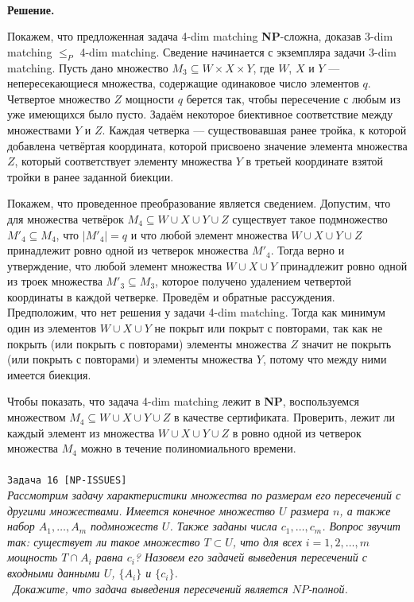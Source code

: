 \documentclass[10pt]{article}
\begin{document}
\ \\[0.3cm]
\textbf{Решение.} 
\medskip\par 
Покажем, что предложенная задача 4-dim matching \textbf{NP}-сложна, доказав 3-dim matching $\leq_P$ 4-dim matching. Сведение начинается с экземпляра задачи 3-dim matching. Пусть дано множество  $M_3 \subseteq W\times X\times Y$, где $W$, $X$ и $Y$ --- непересекающиеся множества, содержащие одинаковое число элементов $q$. Четвертое множество $Z$ мощности $q$ берется так, чтобы пересечение с любым из уже имеющихся было пусто. Задаём некоторое биективное соответствие между множествами $Y$ и $Z$. Каждая четверка --- существовавшая ранее тройка, к которой добавлена четвёртая координата, которой присвоено значение элемента множества $Z$, который соответствует элементу множества $Y$ в третьей координате взятой тройки в ранее заданной биекции.
\medskip\par Покажем, что проведенное преобразование является сведением. Допустим, что для множества четвёрок $M_4\subseteq W\cup X\cup Y\cup Z$ существует такое подмножество $M'_4\subseteq M_4$, что $|M'_4|=q$ и что любой элемент множества $W\cup X\cup Y\cup Z$ принадлежит ровно одной из четверок множества $M'_4$. Тогда верно и утверждение, что любой элемент множества $W\cup X\cup Y$ принадлежит ровно одной из троек множества $M'_3\subseteq M_3$, которое получено удалением четвертой координаты в каждой четверке. Проведём и обратные рассуждения. Предположим, что нет решения у задачи 4-dim matching. Тогда как минимум один из элементов $W\cup X\cup Y$ не покрыт или покрыт с повторами, так как не покрыть (или покрыть с повторами) элементы множества $Z$ значит не покрыть (или покрыть с повторами) и элементы множества $Y$, потому что между ними имеется биекция.
\medskip\par Чтобы показать, что задача 4-dim matching лежит в \textbf{NP}, воспользуемся множеством $M_4\subseteq W\cup X\cup Y\cup Z$ в качестве сертификата. Проверить, лежит ли каждый элемент из множества $W\cup X\cup Y\cup Z$ в ровно одной из четверок множества $M_4$ можно в течение полиномиального времени.
\ \\[0.5 cm]
\hline
\ \\[0.5 cm]
{\large\texttt{Задача 16 [NP-ISSUES]}}
\ \\[0.1cm]
\textit{Рассмотрим задачу характеристики множества по размерам его пересечений
с другими множествами. Имеется конечное множество $U$ размера $n$, а также
набор $A_1, \dots, A_m$ подмножеств $U$. Также заданы числа $c_1, \dots, c_m$. Вопрос звучит так: существует ли такое множество $T\subset U$, что для всех $i = 1, 2, \dots, m$ мощность $T \cap A_i$ равна $c_i$? Назовем его задачей выведения пересечений с входными данными $U$, $\{A_i\}$ и $\{c_i\}$.
\\ \
Докажите, что задача выведения пересечений является $NP$-полной.
}
\end{document}
